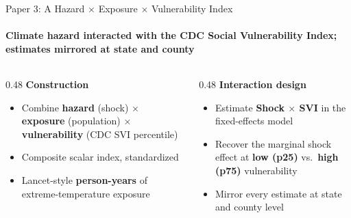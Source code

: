 \documentclass[aspectratio=169,11pt]{beamer}
\newcommand{\emphcolor}[1]{{\color{WarmOrange}\textbf{#1}}}
\newcommand{\tealtext}[1]{{\color{Teal}#1}}
\begin{document}
\begin{frame}{Paper 3: A Hazard \(\times\) Exposure \(\times\) Vulnerability Index}
  \framesubtitle{Climate hazard interacted with the CDC Social Vulnerability Index; estimates mirrored at state and county}
  \begin{columns}[T]
    \begin{column}{0.48\textwidth}
      \footnotesize
      \textbf{\tealtext{Construction}}
      \begin{itemize}\itemsep0.14em
        \item Combine \emphcolor{hazard} (shock) $\times$ \emphcolor{exposure} (population) $\times$ \emphcolor{vulnerability} (CDC SVI percentile)
        \item Composite scalar index, standardized
        \item Lancet-style \emphcolor{person-years} of extreme-temperature exposure
      \end{itemize}
    \end{column}
    \begin{column}{0.48\textwidth}
      \footnotesize
      \textbf{\tealtext{Interaction design}}
      \begin{itemize}\itemsep0.14em
        \item Estimate \emphcolor{Shock $\times$ SVI} in the fixed-effects model
        \item Recover the marginal shock effect at \emphcolor{low (p25)} vs.\ \emphcolor{high (p75)} vulnerability
        \item Mirror every estimate at state and county level
      \end{itemize}
    \end{column}
  \end{columns}
\end{frame}
\end{document}
